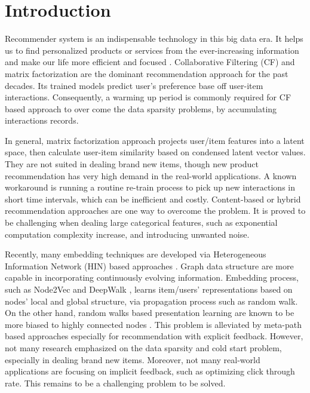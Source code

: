 \section{Introduction}

Recommender system is an indispensable technology in this big data era. It helps us to find personalized products or services from the ever-increasing information and make our life more efficient and focused \cite{lu2015recommender}. Collaborative Filtering (CF) and matrix factorization are the dominant recommendation approach for the past decades. Its trained models predict user's preference base off user-item interactions. Consequently, a warming up period is commonly required for CF based approach to over come the data sparsity problems, by accumulating interactions records.

In general, matrix factorization approach projects user/item features into a latent space, then calculate user-item similarity based on condensed latent vector values. They are not suited in dealing brand new items, though new product recommendation has very high demand in the real-world applications. A known workaround is running a routine re-train process to pick up new interactions in short time intervals, which can be inefficient and costly. Content-based or hybrid recommendation approaches are one way to overcome the problem. It is proved to be challenging when dealing large categorical features, such as exponential computation complexity increase, and introducing unwanted noise.

Recently, many embedding techniques are developed via Heterogeneous Information Network (HIN) based approaches \cite{mao2016multirelational,wang2016member}. Graph data structure are more capable in incorporating continuously evolving information. Embedding process, such as Node2Vec \cite{grover2016node2vec} and DeepWalk \cite{perozzi2014deepwalk}, learns item/users' representations based on nodes' local and global structure, via propagation process such as random walk. On the other hand, random walks based presentation learning are known to be more biased to highly connected nodes \cite{sun2011pathsim}. This problem is alleviated by meta-path based approaches \cite{dong2017metapath2vec} especially for recommendation with explicit feedback. However, not many research emphasized on the data sparsity and cold start problem, especially in dealing brand new items. Moreover, not many real-world applications are focusing on implicit feedback, such as optimizing click through rate. This remains to be a challenging problem to be solved.

